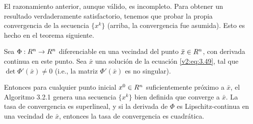 El razonamiento anterior, aunque válido, es incompleto. Para obtener un resultado verdaderamente satisfactorio, tenemos que probar la propia convergencia de la secuencia $\{x^k\}$ (arriba, la convergencia fue asumida). Esto es hecho en el teorema siguiente.

\begin{theorem}\label{v2:thm:3.2.1}
    Sea $\Phi : R^n \to R^n$ diferenciable en una vecindad del punto $\bar{x} \in R^n$, con derivada continua en este punto. Sea $\bar{x}$ una solución de la ecuación \eqref{v2:eq:3.49}, tal que $\det \Phi'(\bar{x}) \neq 0$ (i.e., la matriz $\Phi'(\bar{x})$ es no singular).
    
    Entonces para cualquier punto inicial $x^0 \in R^n$ suficientemente próximo a $\bar{x}$, el Algoritmo 3.2.1 genera una secuencia $\{x^k\}$ bien definida que converge a $\bar{x}$. La tasa de convergencia es superlineal, y si la derivada de $\Phi$ es Lipschitz-continua en una vecindad de $\bar{x}$, entonces la tasa de convergencia es cuadrática.
\end{theorem}


